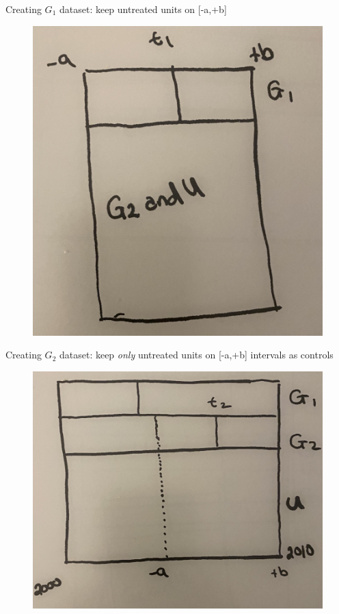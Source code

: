 \documentclass{beamer}
\begin{document}
\begin{frame}{Creating $G_1$ dataset: keep untreated units on [-a,+b]}

	\begin{figure}
	\includegraphics[scale=0.085]{./lecture_includes/stacked3.jpg}
	\end{figure}

\end{frame}


\begin{frame}{Creating $G_2$ dataset: keep \emph{only} untreated units on [-a,+b] intervals as controls}

	\begin{figure}
	\includegraphics[scale=0.085]{./lecture_includes/stacked4.jpg}
	\end{figure}

\end{frame}
\end{document}
